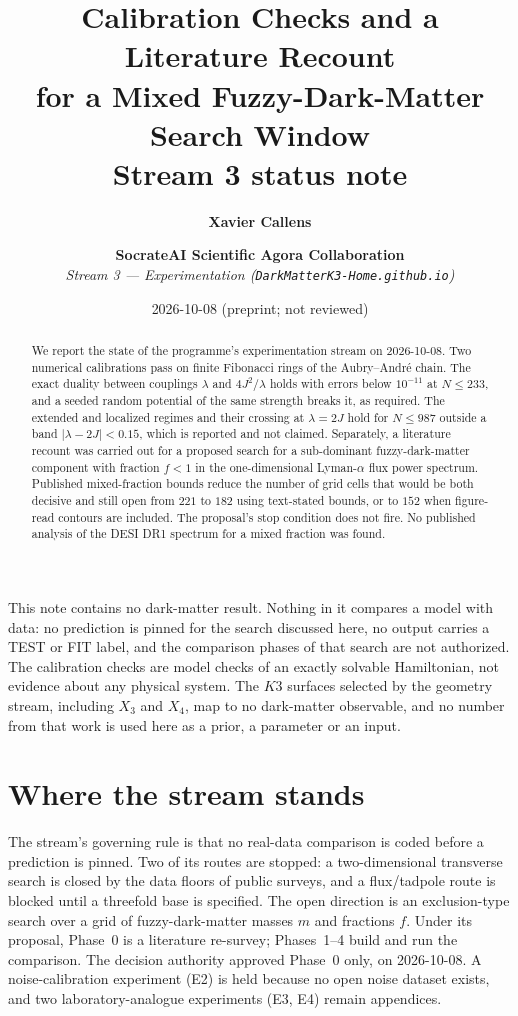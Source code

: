 \documentclass[11pt,a4paper]{article}
\title{\Large \textbf{Calibration Checks and a Literature Recount}\\[0.2em]
\textbf{for a Mixed Fuzzy-Dark-Matter Search Window}\\[0.3em]\large Stream 3 status note}
\author{\textbf{Xavier Callens} \and \textbf{SocrateAI Scientific Agora Collaboration} \\[0.3em]
\textit{Stream 3 --- Experimentation (\texttt{DarkMatterK3-Home.github.io})}}
\date{2026-10-08 \quad (preprint; not reviewed)}
\begin{document}
\maketitle

\begin{scopebox}
This note contains no dark-matter result. Nothing in it compares a model with data: no prediction is pinned
for the search discussed here, no output carries a TEST or FIT label, and the comparison phases of that
search are not authorized. The calibration checks are model checks of an exactly solvable Hamiltonian, not
evidence about any physical system. The $K3$ surfaces selected by the geometry stream, including $X_3$ and
$X_4$, map to no dark-matter observable, and no number from that work is used here as a prior, a parameter
or an input.
\end{scopebox}

\begin{abstract}
We report the state of the programme's experimentation stream on 2026-10-08. Two numerical calibrations
pass on finite Fibonacci rings of the Aubry--Andr\'e chain. The exact duality between couplings $\lambda$ and
$4J^2/\lambda$ holds with errors below $10^{-11}$ at $N\le233$, and a seeded random potential of the same strength
breaks it, as required. The extended and localized regimes and their crossing at $\lambda=2J$ hold for
$N\le987$ outside a band $|\lambda-2J|<0.15$, which is reported and not claimed. Separately, a literature
recount was carried out for a proposed search for a sub-dominant fuzzy-dark-matter component with fraction
$f<1$ in the one-dimensional Lyman-$\alpha$ flux power spectrum. Published mixed-fraction bounds reduce the
number of grid cells that would be both decisive and still open from $221$ to $182$ using text-stated bounds,
or to $152$ when figure-read contours are included. The proposal's stop condition does not fire. No published
analysis of the DESI DR1 spectrum for a mixed fraction was found.
\end{abstract}

\section{Where the stream stands}\label{sec:status}

The stream's governing rule is that no real-data comparison is coded before a prediction is pinned. Two of
its routes are stopped: a two-dimensional transverse search is closed by the data floors of public surveys,
and a flux/tadpole route is blocked until a threefold base is specified. The open direction is an exclusion-type
search over a grid of fuzzy-dark-matter masses $m$ and fractions $f$. Under its proposal, Phase~0 is a
literature re-survey; Phases~1--4 build and run the comparison. The decision authority approved Phase~0 only,
on 2026-10-08. A noise-calibration experiment (E2) is held because no open noise dataset exists, and two
laboratory-analogue experiments (E3, E4) remain appendices.
\end{document}
